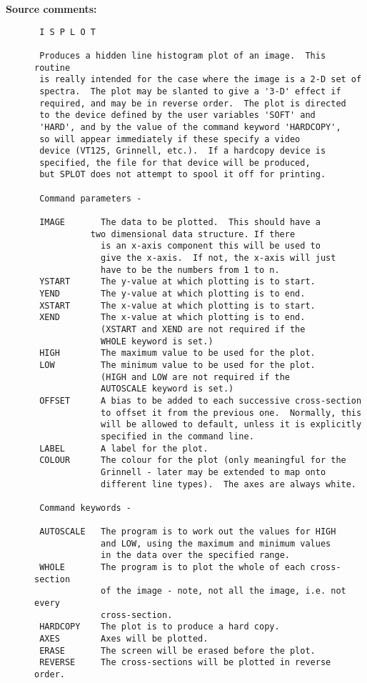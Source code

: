 \begin{description}
\item [{\bf Source comments:}]
\begin{verbatim}
 I S P L O T

 Produces a hidden line histogram plot of an image.  This routine
 is really intended for the case where the image is a 2-D set of
 spectra.  The plot may be slanted to give a '3-D' effect if
 required, and may be in reverse order.  The plot is directed
 to the device defined by the user variables 'SOFT' and
 'HARD', and by the value of the command keyword 'HARDCOPY',
 so will appear immediately if these specify a video
 device (VT125, Grinnell, etc.).  If a hardcopy device is
 specified, the file for that device will be produced,
 but SPLOT does not attempt to spool it off for printing.

 Command parameters -

 IMAGE       The data to be plotted.  This should have a
           two dimensional data structure. If there
             is an x-axis component this will be used to
             give the x-axis.  If not, the x-axis will just
             have to be the numbers from 1 to n.
 YSTART      The y-value at which plotting is to start.
 YEND        The y-value at which plotting is to end.
 XSTART      The x-value at which plotting is to start.
 XEND        The x-value at which plotting is to end.
             (XSTART and XEND are not required if the
             WHOLE keyword is set.)
 HIGH        The maximum value to be used for the plot.
 LOW         The minimum value to be used for the plot.
             (HIGH and LOW are not required if the
             AUTOSCALE keyword is set.)
 OFFSET      A bias to be added to each successive cross-section
             to offset it from the previous one.  Normally, this
             will be allowed to default, unless it is explicitly
             specified in the command line.
 LABEL       A label for the plot.
 COLOUR      The colour for the plot (only meaningful for the
             Grinnell - later may be extended to map onto
             different line types).  The axes are always white.

 Command keywords -

 AUTOSCALE   The program is to work out the values for HIGH
             and LOW, using the maximum and minimum values
             in the data over the specified range.
 WHOLE       The program is to plot the whole of each cross-section
             of the image - note, not all the image, i.e. not every
             cross-section.
 HARDCOPY    The plot is to produce a hard copy.
 AXES        Axes will be plotted.
 ERASE       The screen will be erased before the plot.
 REVERSE     The cross-sections will be plotted in reverse order.


\end{verbatim}
\end{description}
